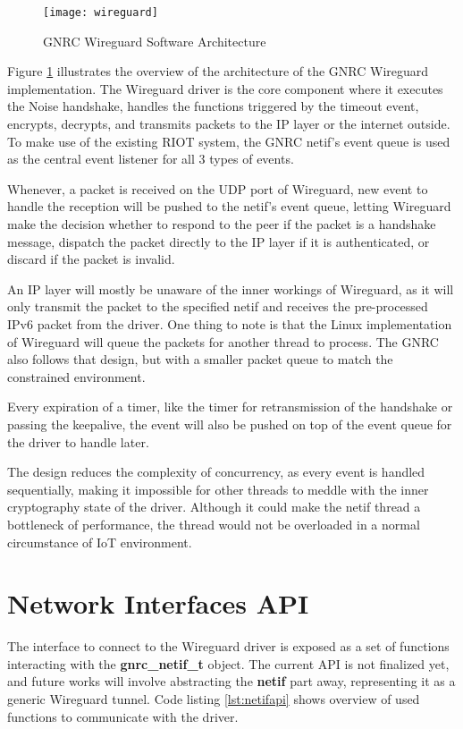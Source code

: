   \begin{figure}[h]
    \centering
    \texttt{[image: wireguard]}
    \caption{GNRC Wireguard Software Architecture}
    \label{fig:wireguard}
  \end{figure}

  Figure \ref{fig:wireguard} illustrates the overview of the architecture of the GNRC Wireguard
  implementation. The Wireguard driver is the core component where it executes the Noise handshake,
  handles the functions triggered by the timeout event, encrypts, decrypts, and transmits packets to
  the IP layer or the internet outside. To make use of the existing RIOT system, the GNRC netif's
  event queue is used as the central event listener for all 3 types of events. 
  
  Whenever, a packet is received on the UDP port of Wireguard, new event to handle the reception will be pushed
  to the netif's event queue, letting Wireguard make the decision whether to respond to 
  the peer if the packet is a handshake message, dispatch the packet directly to the IP layer if 
  it is authenticated, or discard if the packet is invalid. 

  An IP layer will mostly be unaware of the inner workings of Wireguard, as it will only transmit the
  packet to the specified netif and receives the pre-processed IPv6 packet from the driver. One thing
  to note is that the Linux implementation of Wireguard will queue the packets for another thread
  to process. The GNRC also follows that design, but with a smaller packet queue to match the
  constrained environment.

  Every expiration of a timer, like the timer for retransmission of the handshake or passing the
  keepalive, the event will also be pushed on top of the event queue for the driver to handle later.
  
  The design reduces the complexity of concurrency, as every event is handled sequentially, making it impossible for 
  other threads to
  meddle with the inner cryptography state of the driver. Although it could make the netif thread
  a bottleneck of performance, the thread would not be overloaded in a normal circumstance of
  IoT environment.

\section{Network Interfaces API}
  The interface to connect to the Wireguard driver is exposed as a set of functions interacting
  with the \textbf{gnrc{\_}netif{\_}t} object. The current API is not finalized yet, and future works 
  will involve abstracting the \textbf{netif} part away, representing it as a generic Wireguard tunnel.
  Code listing \ref{lst:netifapi} shows overview of used functions to communicate with the driver.

